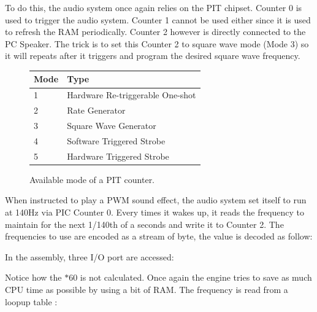 To do this, the audio system once again relies on the PIT chipset. Counter 0 is used to trigger the audio system. Counter 1 cannot be used either since it is used to refresh the RAM periodically. Counter 2 however is directly connected to the PC Speaker. The trick is to set this Counter 2 to square wave mode (Mode 3) so it will repeats after it triggers and program the desired square wave frequency. \\
\par
\begin{figure}[H]
\centering
\begin{tabularx}{\textwidth}{ X X  }
  \toprule
  \textbf{Mode} & \textbf{Type} \\ \bottomrule
1 & Hardware Re-triggerable One-shot\\
2 & Rate Generator\\
3 & Square Wave Generator\\
4 & Software Triggered Strobe\\
5 & Hardware Triggered Strobe\\
\bottomrule
\end{tabularx}
\caption{Available mode of a PIT counter.}
\end{figure}
\par 
When instructed to play a PWM sound effect, the audio system set itself to run at 140Hz via PIC Counter 0. Every times it wakes up, it reads the frequency to maintain for the next 1/140th of a seconds and write it to Counter 2. The frequencies to use are encoded as a stream of byte, the value is decoded as follow:\\
\par 
\begin{minipage}{\textwidth}

\end{minipage}
\par
In the assembly, three I/O port are accessed:\\
\par
\begin{minipage}{\textwidth}

\end{minipage}
\par
Notice how the $ * 60$ is not calculated. Once again the engine tries to save as much CPU time as possible by using a bit of RAM. The frequency is read from a loopup table :\\
\par
\begin{minipage}{\textwidth}

\end{minipage}
